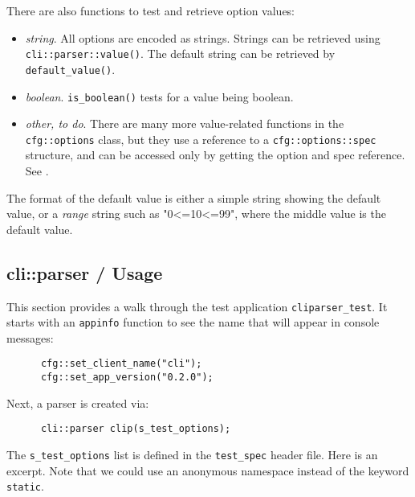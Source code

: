    There are also functions to test and retrieve option values:

   \begin{itemize}
      \item \textsl{string}.
         All options are encoded as strings.
         Strings can be retrieved using \texttt{cli::parser::value()}.
         The default string can be retrieved by \texttt{default\_value()}.
      \item \textsl{boolean}.
         \texttt{is\_boolean()} tests for a value being boolean.
      \item \textsl{other, to do}.
         There are many more value-related functions in the
         \texttt{cfg::options} class, but they use a reference to
         a \texttt{cfg::options::spec} structure, and can be accessed
         only by getting the option and spec reference.
         See .
   \end{itemize}

   The format of the default value is either a simple string showing the
   default value, or a \textsl{range} string such as "0<=10<=99", where
   the middle value is the default value.

\subsection{cli::parser / Usage}
\label{subsec:cli_namespace_parser_usage}

   This section provides a walk through the test application
   \texttt{cliparser\_test}. It starts with an \texttt{appinfo} function
   to see the name that will appear in console messages:

   \begin{verbatim}
      cfg::set_client_name("cli");
      cfg::set_app_version("0.2.0");
   \end{verbatim}

   Next, a parser is created via:

   \begin{verbatim}
      cli::parser clip(s_test_options);
   \end{verbatim}

   The \texttt{s\_test\_options} list is defined in the \texttt{test\_spec}
   header file. Here is an excerpt. Note that we could use an anonymous
   namespace instead of the keyword \texttt{static}.

